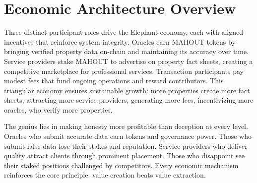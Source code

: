 \section{Economic Architecture Overview}

Three distinct participant roles drive the Elephant economy, each with aligned incentives that reinforce system integrity. Oracles earn MAHOUT tokens by bringing verified property data on-chain and maintaining its accuracy over time. Service providers stake MAHOUT to advertise on property fact sheets, creating a competitive marketplace for professional services. Transaction participants pay modest fees that fund ongoing operations and reward contributors. This triangular economy ensures sustainable growth: more properties create more fact sheets, attracting more service providers, generating more fees, incentivizing more oracles, who verify more properties.

The genius lies in making honesty more profitable than deception at every level. Oracles who submit accurate data earn tokens and governance power. Those who submit false data lose their stakes and reputation. Service providers who deliver quality attract clients through prominent placement. Those who disappoint see their staked positions challenged by competitors. Every economic mechanism reinforces the core principle: value creation beats value extraction.

